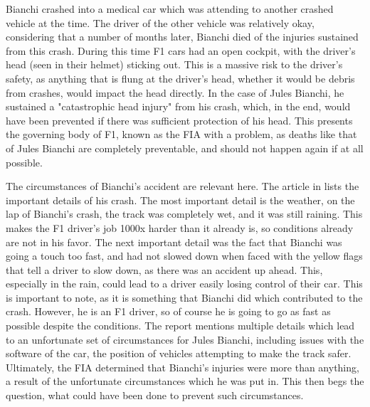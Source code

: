 \documentclass[letterpaper, 12pt]{article}
\numberwithin{figure}{section}
\begin{document}
Bianchi crashed into a medical car which was attending to another crashed vehicle at the time. The driver of the other vehicle was relatively okay, considering that a number of months later, Bianchi died of the injuries sustained from this crash. During this time F1 cars had an open cockpit, with the driver's head (seen in their helmet) sticking out. This is a massive risk to the driver's safety, as anything that is flung at the driver's head, whether it would be debris from crashes, would impact the head directly. In the case of Jules Bianchi, he sustained a "catastrophic head injury" \cite{halogood} from his crash, which, in the end, would have been prevented if there was sufficient protection of his head. This presents the governing body of F1, known as the FIA with a problem, as deaths like that of Jules Bianchi are completely preventable, and should not happen again if at all possible.

The circumstances of Bianchi's accident are relevant here. The article in \cite{bianchi} lists the important details of his crash. The most important detail is the weather, on the lap of Bianchi's crash, the track was completely wet, and it was still raining. This makes the F1 driver's job 1000x harder than it already is, so conditions already are not in his favor. The next important detail was the fact that Bianchi was going a touch too fast, and had not slowed down when faced with the yellow flags that tell a driver to slow down, as there was an accident up ahead. This, especially in the rain, could lead to a driver easily losing control of their car. This is important to note, as it is something that Bianchi did which contributed to the crash. However, he is an F1 driver, so of course he is going to go as fast as possible despite the conditions. The report mentions multiple details which lead to an unfortunate set of circumstances for Jules Bianchi, including issues with the software of the car, the position of vehicles attempting to make the track safer. Ultimately, the FIA determined that Bianchi's injuries were more than anything, a result of the unfortunate circumstances which he was put in. This then begs the question, what could have been done to prevent such circumstances.
\end{document}
